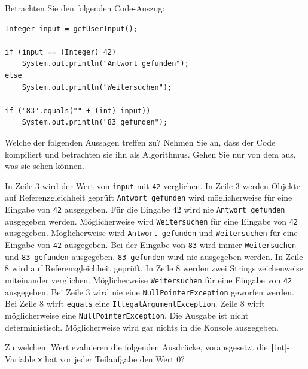 \documentclass[11pt]{exam} %
\newcommand{\code}[1]{\texttt|#1|}
\newcommand{\fillinline}[1]{\fillin[\code{#1}][3cm]\xrfill[-1pt]{0.2mm}}
\newcommand{\fillinlinexl}[1]{\fillin[\code{#1}][9cm]\xrfill[-1pt]{0.2mm}}
\begin{document}
\begin{questions}
\question Betrachten Sie den folgenden Code-Auszug:
\begin{verbatim}
Integer input = getUserInput();

if (input == (Integer) 42)
	System.out.println("Antwort gefunden");
else
	System.out.println("Weitersuchen");
	
if ("83".equals("" + (int) input))
	System.out.println("83 gefunden");
\end{verbatim}
Welche der folgenden Aussagen treffen zu? Nehmen Sie an, dass der Code kompiliert und betrachten sie ihn als Algorithmus. Gehen Sie nur von dem aus, was sie sehen können. 
\begin{checkboxes}
\choice In Zeile 3 wird der Wert von \texttt{input} mit \texttt{42} verglichen.
\CorrectChoice In Zeile 3 werden Objekte auf Referenzgleichheit geprüft
\CorrectChoice \texttt{Antwort gefunden} wird möglicherweise für eine Eingabe von \texttt{42} ausgegeben.
\choice Für die Eingabe 42 wird nie \texttt{Antwort gefunden} ausgegeben werden.
\CorrectChoice Möglicherweise wird \texttt{Weitersuchen} für eine Eingabe von \texttt{42} ausgegeben.
\choice Möglicherweise wird \texttt{Antwort gefunden} und \texttt{Weitersuchen} für eine Eingabe von \texttt{42} ausgegeben.
\CorrectChoice Bei der Eingabe von \texttt{83} wird immer \texttt{Weitersuchen} und \texttt{83 gefunden} ausgegeben.
\choice \texttt{83 gefunden} wird nie ausgegeben werden.
\choice In Zeile 8 wird auf Referenzgleichheit geprüft.
\CorrectChoice In Zeile 8 werden zwei Strings zeichenweise miteinander verglichen.
\CorrectChoice Möglicherweise \texttt{Weitersuchen} für eine Eingabe von \texttt{42} ausgegeben.
\choice Bei Zeile 3 wird nie eine \texttt{NullPointerException} geworfen werden.
\choice Bei Zeile 8 wirft \texttt{equals} eine \texttt{IllegalArgumentException}.
\CorrectChoice Zeile 8 wirft möglicherweise eine \texttt{NullPointerException}.
\choice Die Ausgabe ist nicht deterministisch.
\CorrectChoice Möglicherweise wird gar nichts in die Konsole ausgegeben.
\end{checkboxes}
\question Zu welchem Wert evaluieren die folgenden Ausdrücke, vorausgesetzt die \code{int}-Variable \texttt{x} hat vor jeder Teilaufgabe den Wert 0?
\begin{parts}

\end{parts}
\end{questions}
\end{document}
